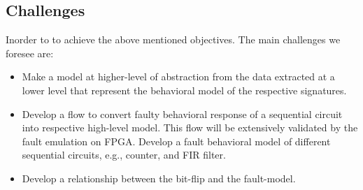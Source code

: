 \begin{itemize}
%
%
%
%
%





\end{itemize}




\subsection{Challenges}
Inorder to to achieve the above mentioned objectives. The main challenges we foresee are:
\begin{itemize}

\item Make a model at higher-level of abstraction from the data extracted at a lower level that represent the behavioral model of the respective signatures.
\item Develop a flow to convert faulty behavioral response of a sequential circuit into respective high-level model. This flow will be extensively validated by the fault emulation on FPGA. Develop a  fault behavioral model of different sequential circuits, e.g., counter, and FIR filter.

\item Develop a relationship between the bit-flip and the fault-model.

\end{itemize}


